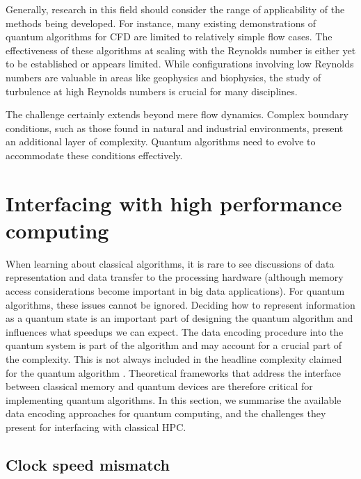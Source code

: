 \documentclass[10pt]{iopart}
\begin{document}
Generally, research in this field should consider the range of applicability of the methods being developed. For instance, many existing demonstrations of quantum algorithms for CFD are limited to relatively simple flow cases. The effectiveness of these algorithms at scaling with the Reynolds number is either yet to be established or appears limited. While configurations involving low Reynolds numbers are valuable in areas like geophysics and biophysics, the study of turbulence at high Reynolds numbers is crucial for many disciplines. 

The challenge certainly extends beyond mere flow dynamics. Complex boundary conditions, such as those found in natural and industrial environments, present an additional layer of complexity. Quantum algorithms need to evolve to accommodate these conditions effectively. 



\section{Interfacing with high performance computing}\label{sec:hpc}

When learning about classical algorithms, it is rare to see discussions of data representation and data transfer to the processing hardware (although memory access considerations become important in big data applications). For quantum algorithms, these issues cannot be ignored. Deciding how to represent information as a quantum state is an important part of designing the quantum algorithm and influences what speedups we can expect. The data encoding procedure into the quantum system is part of the algorithm and may account for a crucial part of the complexity. This is not always included in the headline complexity claimed for the quantum algorithm \cite{Aaronson2015}. Theoretical frameworks that address the interface between classical memory and quantum devices are therefore critical for implementing quantum algorithms. In this section, we summarise the available data encoding approaches for quantum computing, and the challenges they present for interfacing with classical HPC.

\subsection{Clock speed mismatch}
\end{document}
